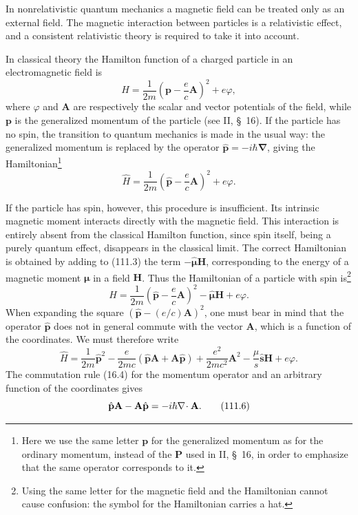 In nonrelativistic quantum mechanics a magnetic field can be treated only as
an external field. The magnetic interaction between particles is a
relativistic effect, and a consistent relativistic theory is required to take
it into account.

In classical theory the Hamilton function of a charged particle in an
electromagnetic field is
\[
 H=\frac{1}{2m}\left(\mathbf p-\frac ec\mathbf A\right)^2+e\varphi,
\]
where $\varphi$ and $\mathbf A$ are respectively the scalar and vector
potentials of the field, while $\mathbf p$ is the generalized momentum of the
particle (see II, \S~16). If the particle has no spin, the transition to
quantum mechanics is made in the usual way: the generalized momentum is
replaced by the operator $\hat{\mathbf p}=-i\hbar\boldsymbol\nabla$, giving the
Hamiltonian\footnote{Here we use the same letter $\mathbf p$ for the
generalized momentum as for the ordinary momentum, instead of the $\mathbf P$
used in II, \S~16, in order to emphasize that the same operator corresponds to
it.}
\begin{equation}
 \hat H=\frac{1}{2m}\left(\hat{\mathbf p}-\frac ec\mathbf A\right)^2+e\varphi.
 \tag{111.3}
\end{equation}

If the particle has spin, however, this procedure is insufficient. Its
intrinsic magnetic moment interacts directly with the magnetic field. This
interaction is entirely absent from the classical Hamilton function, since
spin itself, being a purely quantum effect, disappears in the classical
limit. The correct Hamiltonian is obtained by adding to (111.3) the term
$-\hat{\boldsymbol\mu}\mathbf H$, corresponding to the energy of a magnetic
moment $\boldsymbol\mu$ in a field $\mathbf H$. Thus the
Hamiltonian of a particle with spin is\footnote{Using the same letter for the
magnetic field and the Hamiltonian cannot cause confusion: the symbol for the
Hamiltonian carries a hat.}
\begin{equation}
 \hat H=\frac{1}{2m}\left(\hat{\mathbf p}-\frac ec\mathbf A\right)^2-\hat{\boldsymbol\mu}\mathbf H+e\varphi.
 \tag{111.4}
\end{equation}
When expanding the square $(\hat{\mathbf p}-(e/c)\mathbf A)^2$, one must bear
in mind that the operator $\hat{\mathbf p}$ does not in general commute with
the vector $\mathbf A$, which is a function of the coordinates. We must
therefore write
\begin{equation}
 \hat H=\frac{1}{2m}\hat{\mathbf p}^{2}-\frac{e}{2mc}(\hat{\mathbf p}\mathbf A+\mathbf A\hat{\mathbf p})+\frac{e^2}{2mc^2}\mathbf A^2-\frac{\mu}{s}\hat{\mathbf s}\mathbf H+e\varphi.
 \tag{111.5}
\end{equation}
The commutation rule (16.4) for the momentum operator and an arbitrary
function of the coordinates gives
\begin{equation}
 \hat{\mathbf p}\mathbf A-\mathbf A\hat{\mathbf p}=-i\hbar\nabla\!\cdot \mathbf A.
 \tag{111.6}
\end{equation}

